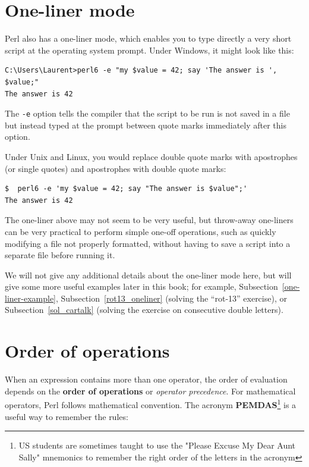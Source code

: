 \section{One-liner mode}

Perl also has a one-liner mode, which enables you to type directly a very
short script at the operating system prompt. Under Windows, it might 
look like this:
\label{one-liner mode}

\begin{verbatim}
C:\Users\Laurent>perl6 -e "my $value = 42; say 'The answer is ', $value;"
The answer is 42

\end{verbatim}

The {\tt -e} option tells the compiler that the script to be run is not 
saved in a file but instead typed at the prompt between quote marks immediately after 
this option.

Under Unix and Linux, you would replace double quote marks with apostrophes (or single quotes) 
and apostrophes with double quote marks:

\begin{verbatim}
$  perl6 -e 'my $value = 42; say "The answer is $value";'
The answer is 42

\end{verbatim}

The one-liner above may not seem to be very useful, but 
throw-away one-liners can be very practical to perform 
simple one-off operations, such as quickly modifying 
a file not properly formatted, without having to save a script 
into a separate file before running it.

We will not give any additional details about the one-liner 
mode here, but will give some more useful examples 
later in this book; for example, 
Subsection~\ref{one-liner-example},
Subsection~\ref{rot13_oneliner} (solving the ``rot-13'' exercise), or
Subsection~\ref{sol_cartalk} (solving the exercise on 
consecutive double letters). 



\section{Order of operations}

When an expression contains more than one operator, the order of
evaluation depends on the {\bf order of operations} or \emph{operator precedence}. 
For mathematical operators, Perl follows mathematical convention.
The acronym {\bf PEMDAS}\footnote{US students are sometimes taught 
to use the "Please Excuse My Dear Aunt Sally" mnemonics to remember 
the right order of the letters in the acronym} is a useful 
way to remember the rules:

